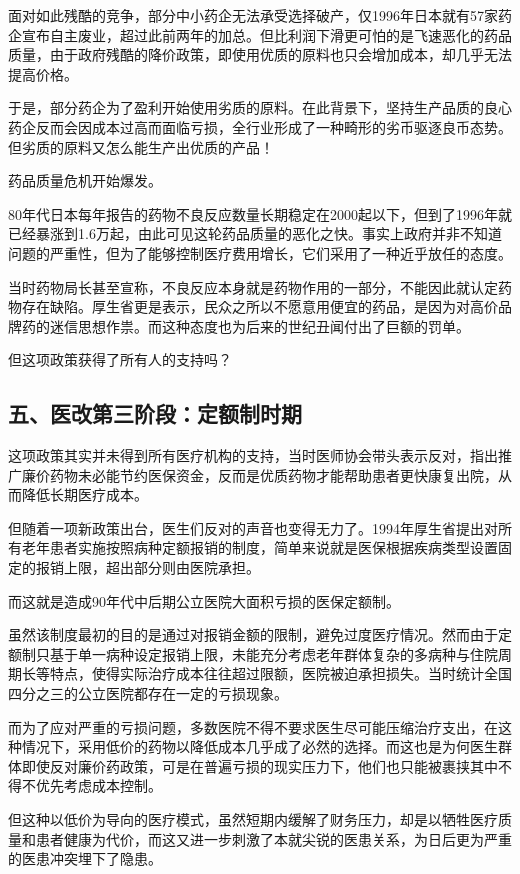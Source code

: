 面对如此残酷的竞争，部分中小药企无法承受选择破产，仅1996年日本就有57家药企宣布自主废业，超过此前两年的加总。但比利润下滑更可怕的是飞速恶化的药品质量，由于政府残酷的降价政策，即使用优质的原料也只会增加成本，却几乎无法提高价格。

于是，部分药企为了盈利开始使用劣质的原料。在此背景下，坚持生产品质的良心药企反而会因成本过高而面临亏损，全行业形成了一种畸形的劣币驱逐良币态势。但劣质的原料又怎么能生产出优质的产品！

药品质量危机开始爆发。

80年代日本每年报告的药物不良反应数量长期稳定在2000起以下，但到了1996年就已经暴涨到1.6万起，由此可见这轮药品质量的恶化之快。事实上政府并非不知道问题的严重性，但为了能够控制医疗费用增长，它们采用了一种近乎放任的态度。

当时药物局长甚至宣称，不良反应本身就是药物作用的一部分，不能因此就认定药物存在缺陷。厚生省更是表示，民众之所以不愿意用便宜的药品，是因为对高价品牌药的迷信思想作祟。而这种态度也为后来的世纪丑闻付出了巨额的罚单。

但这项政策获得了所有人的支持吗？

\subsection{五、医改第三阶段：定额制时期}

这项政策其实并未得到所有医疗机构的支持，当时医师协会带头表示反对，指出推广廉价药物未必能节约医保资金，反而是优质药物才能帮助患者更快康复出院，从而降低长期医疗成本。

但随着一项新政策出台，医生们反对的声音也变得无力了。1994年厚生省提出对所有老年患者实施按照病种定额报销的制度，简单来说就是医保根据疾病类型设置固定的报销上限，超出部分则由医院承担。

而这就是造成90年代中后期公立医院大面积亏损的医保定额制。

虽然该制度最初的目的是通过对报销金额的限制，避免过度医疗情况。然而由于定额制只基于单一病种设定报销上限，未能充分考虑老年群体复杂的多病种与住院周期长等特点，使得实际治疗成本往往超过限额，医院被迫承担损失。当时统计全国四分之三的公立医院都存在一定的亏损现象。

而为了应对严重的亏损问题，多数医院不得不要求医生尽可能压缩治疗支出，在这种情况下，采用低价的药物以降低成本几乎成了必然的选择。而这也是为何医生群体即使反对廉价药政策，可是在普遍亏损的现实压力下，他们也只能被裹挟其中不得不优先考虑成本控制。

但这种以低价为导向的医疗模式，虽然短期内缓解了财务压力，却是以牺牲医疗质量和患者健康为代价，而这又进一步刺激了本就尖锐的医患关系，为日后更为严重的医患冲突埋下了隐患。

